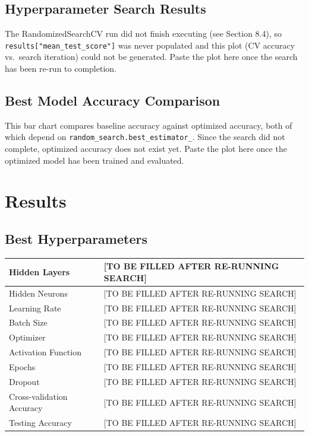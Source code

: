 \documentclass[11pt]{article}
\begin{document}
\subsection{Hyperparameter Search Results}
\begin{tcolorbox}[colback=gray!5, colframe=gray!60, title=\textbf{PLACEHOLDER -- Hyperparameter Search Results plot}]
The RandomizedSearchCV run did not finish executing (see Section 8.4), so \texttt{results["mean\_test\_score"]} was never populated and this plot (CV accuracy vs.\ search iteration) could not be generated. Paste the plot here once the search has been re-run to completion.
\end{tcolorbox}

\subsection{Best Model Accuracy Comparison}
\begin{tcolorbox}[colback=gray!5, colframe=gray!60, title=\textbf{PLACEHOLDER -- Baseline vs Optimized bar chart}]
This bar chart compares baseline accuracy against optimized accuracy, both of which depend on \texttt{random\_search.best\_estimator\_}. Since the search did not complete, optimized accuracy does not exist yet. Paste the plot here once the optimized model has been trained and evaluated.
\end{tcolorbox}

\section{Results}

\subsection*{Best Hyperparameters}
\begin{center}
\begin{tabular}{|l|l|}
\hline
Hidden Layers & [TO BE FILLED AFTER RE-RUNNING SEARCH] \\
\hline
Hidden Neurons & [TO BE FILLED AFTER RE-RUNNING SEARCH] \\
\hline
Learning Rate & [TO BE FILLED AFTER RE-RUNNING SEARCH] \\
\hline
Batch Size & [TO BE FILLED AFTER RE-RUNNING SEARCH] \\
\hline
Optimizer & [TO BE FILLED AFTER RE-RUNNING SEARCH] \\
\hline
Activation Function & [TO BE FILLED AFTER RE-RUNNING SEARCH] \\
\hline
Epochs & [TO BE FILLED AFTER RE-RUNNING SEARCH] \\
\hline
Dropout & [TO BE FILLED AFTER RE-RUNNING SEARCH] \\
\hline
Cross-validation Accuracy & [TO BE FILLED AFTER RE-RUNNING SEARCH] \\
\hline
Testing Accuracy & [TO BE FILLED AFTER RE-RUNNING SEARCH] \\
\hline
\end{tabular}
\end{center}
\end{document}
